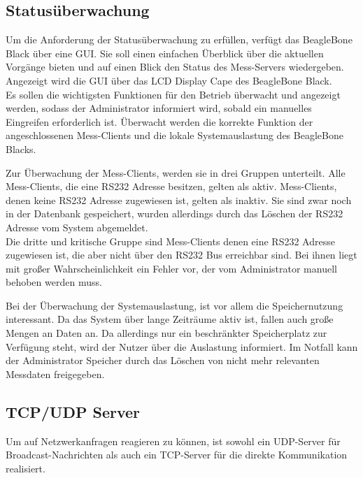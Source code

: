  

\subsection{Statusüberwachung}
\label{section_Statusüberwachung}
Um die Anforderung der Statusüberwachung zu erfüllen, verfügt das BeagleBone Black über eine \ac{GUI}. Sie soll einen einfachen Überblick über die aktuellen Vorgänge bieten und auf einen Blick den Status des Mess-Servers wiedergeben. Angezeigt wird die \ac{GUI} über das LCD Display Cape des BeagleBone Black.\\
Es sollen die wichtigsten Funktionen für den Betrieb überwacht und angezeigt werden, sodass der Administrator informiert wird, sobald ein manuelles Eingreifen erforderlich ist.
Überwacht werden die korrekte Funktion der angeschlossenen Mess-Clients und die lokale Systemauslastung des BeagleBone Blacks.\ 

Zur Überwachung der Mess-Clients, werden sie in drei Gruppen unterteilt. Alle Mess-Clients, die eine RS232 Adresse besitzen, gelten als aktiv. Mess-Clients, denen keine RS232 Adresse zugewiesen ist, gelten als inaktiv. Sie sind zwar noch in der Datenbank gespeichert, wurden allerdings durch das Löschen der RS232 Adresse vom System abgemeldet.\\
Die dritte und kritische Gruppe sind Mess-Clients denen eine RS232 Adresse zugewiesen ist, die aber nicht über den RS232 Bus erreichbar sind. Bei ihnen liegt mit großer Wahrscheinlichkeit ein Fehler vor, der vom Administrator manuell behoben werden muss.\ 

Bei der Überwachung der Systemauslastung, ist vor allem die Speichernutzung interessant. Da das System über lange Zeiträume aktiv ist, fallen auch große Mengen an Daten an. Da allerdings nur ein beschränkter Speicherplatz zur Verfügung steht, wird der Nutzer über die Auslastung informiert. Im Notfall kann der Administrator Speicher durch das Löschen von nicht mehr relevanten Messdaten freigegeben.


\subsection{TCP/UDP Server}
\label{section_TCPUDPServer}
Um auf Netzwerkanfragen reagieren zu können, ist sowohl ein UDP-Server für Broadcast-Nachrichten als auch ein TCP-Server für die direkte Kommunikation realisiert.\ 

